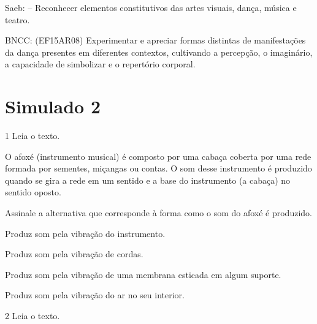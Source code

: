 \begin{escolha}
{Saeb: -- Reconhecer elementos constitutivos das artes visuais, dança,
música e teatro.

BNCC: (EF15AR08) Experimentar e apreciar formas distintas de
manifestações da dança presentes em diferentes contextos, cultivando a
percepção, o imaginário, a capacidade de simbolizar e o repertório
corporal.}

\chapter{Simulado 2}

\num{1}  Leia o texto.


O afoxé (instrumento musical) é composto por uma cabaça coberta por uma
rede formada por sementes, miçangas ou contas. O som desse instrumento é
produzido quando se gira a rede em um sentido e a base do instrumento (a
cabaça) no sentido oposto.

Assinale a alternativa que corresponde à forma como o som do afoxé é
produzido.

\begin{escolha}
\item
  Produz som pela vibração do instrumento.
\item
  Produz som pela vibração de cordas.
\item
  Produz som pela vibração de uma membrana esticada em algum suporte.
\item
  Produz som pela vibração do ar no seu interior.
\end{escolha}


\num{2}  Leia o texto.


\end{escolha}
